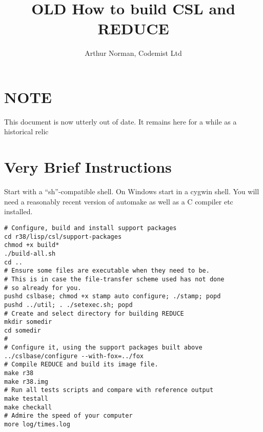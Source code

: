 \documentclass[11pt]{article}
\begin{document}
\title{{\bf OLD} How to build CSL and REDUCE}
\author{Arthur Norman, Codemist Ltd}
\maketitle
\section{NOTE}
{\HUGE This document is now utterly out of date. It remains here for
a while as a historical relic}

\section{Very Brief Instructions}
Start with a ``sh''-compatible shell. On Windows start in a
cygwin shell. You will need a reasonably recent version of
automake as well as a C compiler etc installed.
\begin{verbatim}
# Configure, build and install support packages
cd r38/lisp/csl/support-packages
chmod +x build*
./build-all.sh
cd ..
# Ensure some files are executable when they need to be.
# This is in case the file-transfer scheme used has not done
# so already for you.
pushd cslbase; chmod +x stamp auto configure; ./stamp; popd
pushd ../util; . ./setexec.sh; popd
# Create and select directory for building REDUCE
mkdir somedir
cd somedir
#
# Configure it, using the support packages built above
../cslbase/configure --with-fox=../fox
# Compile REDUCE and build its image file.
make r38
make r38.img
# Run all tests scripts and compare with reference output
make testall
make checkall
# Admire the speed of your computer
more log/times.log
\end{verbatim}
\end{document}
